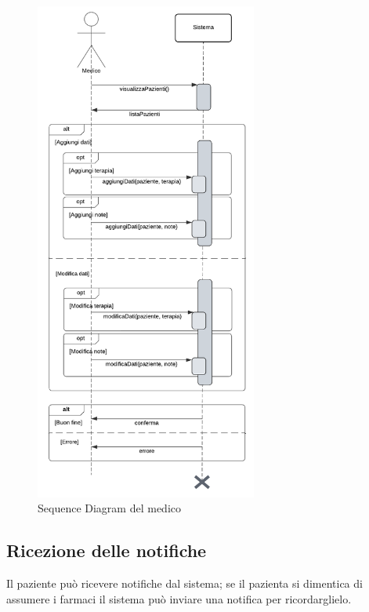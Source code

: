 \documentclass[a4paper]{article}
\begin{document}
\begin{figure}[H]
  \centering
  \includegraphics[width=0.65\textwidth]{sdMedico}
  \caption{Sequence Diagram del medico}
  \label{fig:sdMedico}
\end{figure}

\subsection{Ricezione delle notifiche}

Il paziente può ricevere notifiche dal sistema; se il pazienta si dimentica di assumere i farmaci
il sistema può inviare una notifica per ricordarglielo. 
\end{document}
